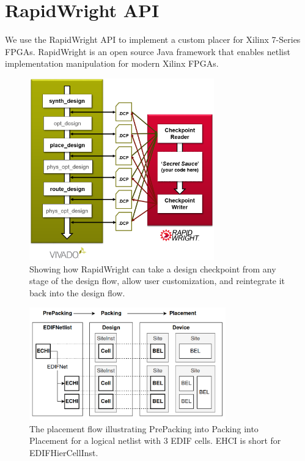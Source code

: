 \documentclass[twocolumn]{article}
\begin{document}
\section{RapidWright API}
    We use the RapidWright API to implement a custom placer for Xilinx 7-Series FPGAs.
    RapidWright is an open source Java framework that enables netlist implementation manipulation for modern Xilinx FPGAs. 

    \begin{figure}[]
        \centering
        \includegraphics[width=8.0cm]{figures/vivado_dcps.png}
        \caption{Showing how RapidWright can take a design checkpoint from any stage of the design flow, allow user customization, and reintegrate it back into the design flow.}
        \label{fig:vivado_dcps}
    \end{figure}

    \begin{figure}[]
        \centering
        \includegraphics[width=8.5cm]{figures/edif_design_device.png}
        \caption{The placement flow illustrating PrePacking into Packing into Placement for a logical netlist with 3 EDIF cells. EHCI is short for EDIFHierCellInst.}
        \label{fig:edif_design_device}
    \end{figure}
\end{document}
